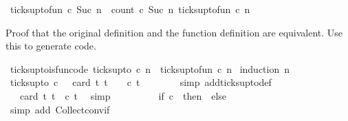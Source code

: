 \begin{isabellebody}
{\isacharbar}\ {\isacartoucheopen}ticks{\isacharunderscore}up{\isacharunderscore}to{\isacharunderscore}fun\ c\ {\isacharparenleft}Suc\ n{\isacharparenright}\ {\isacharequal}\ count\ {\isacharparenleft}c\ {\isacharparenleft}Suc\ n{\isacharparenright}{\isacharparenright}\ {\isacharparenleft}ticks{\isacharunderscore}up{\isacharunderscore}to{\isacharunderscore}fun\ c\ n{\isacharparenright}{\isacartoucheclose}%
\begin{isamarkuptext}%
Proof that the original definition and the function definition are equivalent.
Use this to generate code.%
\end{isamarkuptext}\isamarkuptrue%
\isamarkupfalse%
\ ticks{\isacharunderscore}up{\isacharunderscore}to{\isacharunderscore}is{\isacharunderscore}fun{\isacharbrackleft}code{\isacharbrackright}{\isacharcolon}\ {\isacartoucheopen}ticks{\isacharunderscore}up{\isacharunderscore}to\ c\ n\ {\isacharequal}\ ticks{\isacharunderscore}up{\isacharunderscore}to{\isacharunderscore}fun\ c\ n{\isacartoucheclose}\isanewline
%
\isadelimproof
%
\endisadelimproof
%
\isatagproof
{}\isamarkupfalse%
\ {\isacharparenleft}induction\ n{\isacharparenright}\isanewline
\ \ \isamarkupfalse%
\ {}\isanewline
\ \ \ \ \isamarkupfalse%
\ {\isacartoucheopen}ticks{\isacharunderscore}up{\isacharunderscore}to\ c\ {}\ {\isacharequal}\ card\ {\isacharbraceleft}t{\isachardot}\ t\ {\isasymle}\ {}\ {\isasymand}\ c\ t{\isacharbraceright}{\isacartoucheclose}\isanewline
\ \ \ \ \ \ \isamarkupfalse%
\ {\isacharparenleft}simp\ add{\isacharcolon}ticks{\isacharunderscore}up{\isacharunderscore}to{\isacharunderscore}def{\isacharparenright}\isanewline
\ \ \ \ \isamarkupfalse%
\ \isamarkupfalse%
\ {\isacartoucheopen}{\isachardot}{\isachardot}{\isachardot}\ {\isacharequal}\ card\ {\isacharbraceleft}t{\isachardot}\ t{\isacharequal}{}\ {\isasymand}\ c\ t{\isacharbraceright}{\isacartoucheclose}\ \isamarkupfalse%
\ simp\isanewline
\ \ \ \ \isamarkupfalse%
\ \isamarkupfalse%
\ {\isacartoucheopen}{\isachardot}{\isachardot}{\isachardot}\ {\isacharequal}\ {\isacharparenleft}if\ c\ {}\ then\ {}\ else\ {}{\isacharparenright}{\isacartoucheclose}\isanewline
\ \ \ \ \ \ \isamarkupfalse%
\ {\isacharparenleft}simp\ add{\isacharcolon}\ Collect{\isacharunderscore}conv{\isacharunderscore}if{\isacharparenright}\isanewline
\ \ \ \ \isamarkupfalse%

\end{isabellebody}
